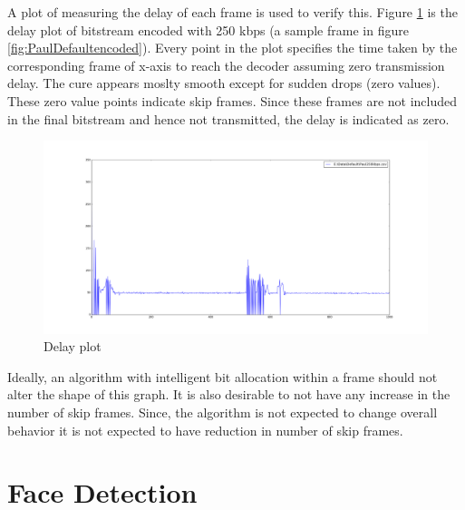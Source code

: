 \documentclass[11pt]{article} %
\begin{document}
A plot of measuring the delay of each frame is used to verify this. Figure \ref{fig:PaulDefault250kbpsDelay} is the delay plot of bitstream encoded with 250 kbps (a sample frame in figure \ref{fig:PaulDefaultencoded}). Every point in the plot specifies the time taken by the corresponding frame of x-axis to reach the decoder assuming zero transmission delay. The cure appears moslty smooth except for sudden drops (zero values). These zero value points indicate skip frames. Since these frames are not included in the final bitstream and hence not transmitted, the delay is indicated as zero. 
\begin{figure}[!h]
    \includegraphics[scale=0.25]{PaulDefault250kbpsDelay}
    \caption{Delay plot}
    \label{fig:PaulDefault250kbpsDelay}
\end{figure} 
Ideally, an algorithm with intelligent bit allocation within a frame should not alter the shape of this graph. It is also desirable to not have any increase in the number of skip frames. Since, the algorithm is not expected to change overall behavior it is not expected to have reduction in number of skip frames.
%
%
\section{Face Detection}
\end{document}
